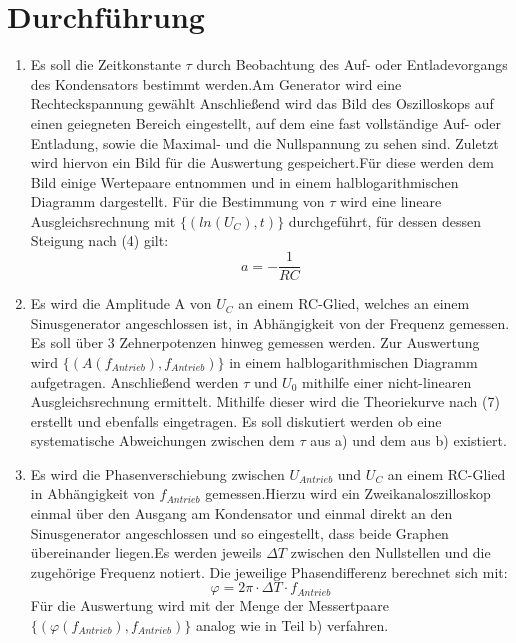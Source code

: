 \section{Durchführung}
\label{sec:Durchführung}
\renewcommand{\labelenumi}{\alph{enumi})}
\begin{enumerate}
  \item Es soll die Zeitkonstante $\tau$ durch Beobachtung des Auf- oder Entladevorgangs
  des Kondensators bestimmt werden.Am Generator wird eine Rechteckspannung gewählt
  Anschließend wird das Bild des Oszilloskops auf einen
  geiegneten Bereich eingestellt, auf dem eine fast vollständige Auf- oder Entladung, sowie
  die Maximal- und die Nullspannung zu sehen sind. Zuletzt wird hiervon ein Bild für die
  Auswertung gespeichert.Für diese werden dem Bild einige Wertepaare entnommen und in einem
  halblogarithmischen Diagramm dargestellt. Für die Bestimmung von $\tau$ wird eine
  lineare Ausgleichsrechnung mit $\{(ln(U_C), t)\}$ durchgeführt, für dessen dessen Steigung nach (4) gilt:
  \begin{equation}
  a = -\frac{1}{RC}
  \end{equation}

  \item Es wird die Amplitude A von $U_C$ an einem RC-Glied, welches an einem Sinusgenerator
   angeschlossen ist, in Abhängigkeit von der Frequenz gemessen. Es soll über
   3 Zehnerpotenzen hinweg gemessen werden. Zur Auswertung wird $\{(A(f_{Antrieb}), f_{Antrieb})\}$
   in einem halblogarithmischen Diagramm aufgetragen. Anschließend werden $\tau$ und $U_0$ mithilfe einer nicht-linearen
    Ausgleichsrechnung ermittelt. Mithilfe dieser wird die Theoriekurve nach (7) erstellt und
    ebenfalls eingetragen. Es soll diskutiert werden ob eine systematische Abweichungen
    zwischen dem $\tau$ aus a) und dem aus b) existiert.



    \item Es wird die Phasenverschiebung zwischen $U_{Antrieb}$ und $U_C$ an einem
    RC-Glied in Abhängigkeit von $f_{Antrieb}$ gemessen.Hierzu wird ein Zweikanaloszilloskop
    einmal über den Ausgang am Kondensator und einmal direkt an den Sinusgenerator angeschlossen
     und so eingestellt, dass beide Graphen übereinander liegen.Es werden jeweils
      $\Delta T$ zwischen den Nullstellen und die zugehörige Frequenz notiert. Die jeweilige
       Phasendifferenz berechnet sich mit:
       \begin{equation}
         \varphi = 2 \pi \cdot \Delta T \cdot f_{Antrieb}
       \end{equation}
       Für die Auswertung wird mit der Menge der Messertpaare $\{(\varphi(f_{Antrieb}),f_{Antrieb})\}$
       analog wie in Teil b) verfahren.


\end{enumerate}
